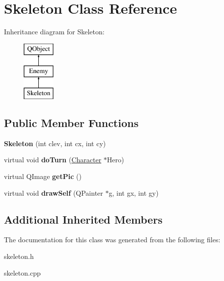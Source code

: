 \hypertarget{class_skeleton}{\section{Skeleton Class Reference}
\label{class_skeleton}
}
Inheritance diagram for Skeleton\-:\begin{figure}[H]
\begin{center}
\leavevmode
\includegraphics[height=3.000000cm]{class_skeleton}
\end{center}
\end{figure}
\subsection*{Public Member Functions}
\begin{DoxyCompactItemize}
\item 
\hypertarget{class_skeleton_ac4920b7ab446add4c8da5c8fe6aff2d3}{{\bfseries Skeleton} (int clev, int cx, int cy)}\label{class_skeleton_ac4920b7ab446add4c8da5c8fe6aff2d3}

\item 
\hypertarget{class_skeleton_aeb5642a3aa8c49cb0cd1cc325f8f0baa}{virtual void {\bfseries do\-Turn} (\hyperlink{class_character}{Character} $\ast$Hero)}\label{class_skeleton_aeb5642a3aa8c49cb0cd1cc325f8f0baa}

\item 
\hypertarget{class_skeleton_a35acfe2e2da4279a56d91bb8f2048489}{virtual Q\-Image {\bfseries get\-Pic} ()}\label{class_skeleton_a35acfe2e2da4279a56d91bb8f2048489}

\item 
\hypertarget{class_skeleton_ae605f24f6e921ad3b36a53f391304722}{virtual void {\bfseries draw\-Self} (Q\-Painter $\ast$g, int gx, int gy)}\label{class_skeleton_ae605f24f6e921ad3b36a53f391304722}

\end{DoxyCompactItemize}
\subsection*{Additional Inherited Members}


The documentation for this class was generated from the following files\-:\begin{DoxyCompactItemize}
\item 
skeleton.\-h\item 
skeleton.\-cpp\end{DoxyCompactItemize}
